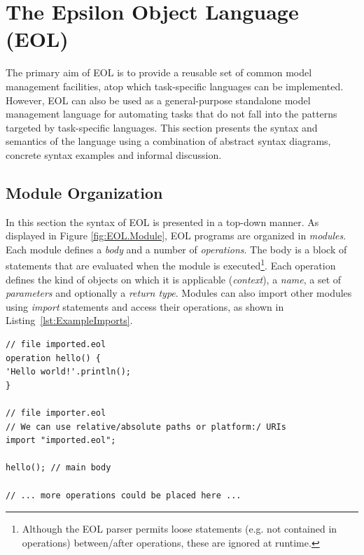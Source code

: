 
\chapter{The Epsilon Object Language (EOL)}
\label{sec:Design.EOL}

The primary aim of EOL is to provide a reusable set of common model management facilities, atop which task-specific languages can be implemented. However, EOL can also be used as a general-purpose standalone model management language for automating tasks that do not fall into the patterns targeted by task-specific languages. This section presents the syntax and semantics of the language using a combination of abstract syntax diagrams, concrete syntax examples and informal discussion.

\section{Module Organization}
\label{sec:Design.EOL.Syntax}
\label{sec:Design.EOL.ModuleStucture}

In this section the syntax of EOL is presented in a top-down manner. As displayed in Figure \ref{fig:EOL.Module}, EOL programs are organized in \emph{modules}. Each module defines a \emph{body} and a number of \emph{operations}. The body is a block of statements that are evaluated when the module is executed\footnote{Although the EOL parser permits loose statements (e.g. not contained in operations) between/after operations, these are ignored at runtime.}. Each operation defines the kind of objects on which it is applicable (\emph{context}), a \emph{name}, a set of \emph{parameters} and optionally a \emph{return type}. Modules can also import other modules using \emph{import} statements and access their operations, as shown in Listing~\ref{lst:ExampleImports}.

\begin{lstlisting}[float=ht, caption={Example of two related EOL modules}, label=lst:ExampleImports, language=EOL]
// file imported.eol
operation hello() {
'Hello world!'.println();
}

// file importer.eol
// We can use relative/absolute paths or platform:/ URIs
import "imported.eol";

hello(); // main body

// ... more operations could be placed here ...
\end{lstlisting}


